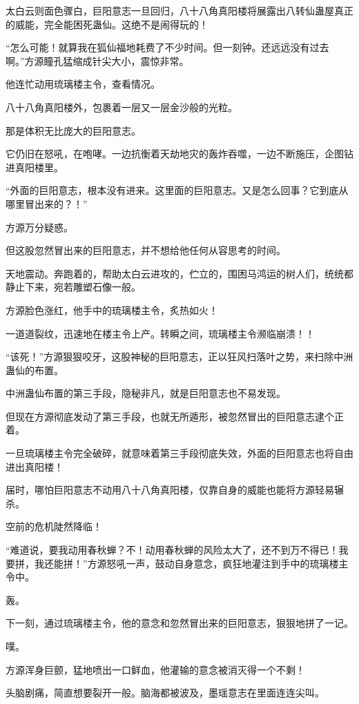 \begin{this_body}
太白云则面色骤白，巨阳意志一旦回归，八十八角真阳楼将展露出八转仙蛊屋真正的威能，完全能困死蛊仙。这绝不是闹得玩的！

“怎么可能！就算我在狐仙福地耗费了不少时间。但一刻钟。还远远没有过去啊。”方源瞳孔猛缩成针尖大小，震惊非常。

他连忙动用琉璃楼主令，查看情况。

八十八角真阳楼外，包裹着一层又一层金沙般的光粒。

那是体积无比庞大的巨阳意志。

它仍旧在怒吼，在咆哮。一边抗衡着天劫地灾的轰炸吞噬，一边不断施压，企图钻进真阳楼里。

“外面的巨阳意志，根本没有进来。这里面的巨阳意志。又是怎么回事？它到底从哪里冒出来的？！”

方源万分疑惑。

但这股忽然冒出来的巨阳意志，并不想给他任何从容思考的时间。

天地震动。奔跑着的，帮助太白云进攻的，伫立的，围困马鸿运的树人们，统统都静止下来，宛若雕塑石像一般。

方源脸色涨红，他手中的琉璃楼主令，炙热如火！

一道道裂纹，迅速地在楼主令上产。转瞬之间，琉璃楼主令濒临崩溃！！

“该死！”方源狠狠咬牙，这股神秘的巨阳意志，正以狂风扫落叶之势，来扫除中洲蛊仙的布置。

中洲蛊仙布置的第三手段，隐秘非凡，就是巨阳意志也不易发现。

但现在方源彻底发动了第三手段，也就无所遁形，被忽然冒出的巨阳意志逮个正着。

一旦琉璃楼主令完全破碎，就意味着第三手段彻底失效，外面的巨阳意志也将自由进出真阳楼！

届时，哪怕巨阳意志不动用八十八角真阳楼，仅靠自身的威能也能将方源轻易辗杀。

空前的危机陡然降临！

“难道说，要我动用春秋蝉？不！动用春秋蝉的风险太大了，还不到万不得已！我要拼，我还能拼！”方源怒吼一声，鼓动自身意念，疯狂地灌注到手中的琉璃楼主令中。

轰。

下一刻，通过琉璃楼主令，他的意念和忽然冒出来的巨阳意志，狠狠地拼了一记。

噗。

方源浑身巨颤，猛地喷出一口鲜血，他灌输的意念被消灭得一个不剩！

头脑剧痛，简直想要裂开一般。脑海都被波及，墨瑶意志在里面连连尖叫。


\end{this_body}
